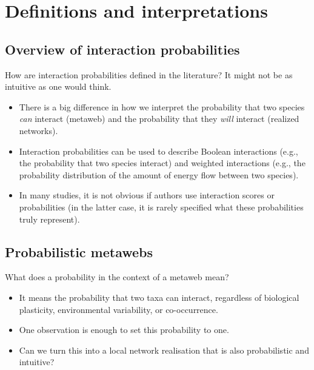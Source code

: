 \documentclass[10pt,oneside]{article}
\begin{document}
\hypertarget{definitions-and-interpretations}{%
\section{Definitions and
interpretations}\label{definitions-and-interpretations}}

\hypertarget{overview-of-interaction-probabilities}{%
\subsection{Overview of interaction
probabilities}\label{overview-of-interaction-probabilities}}

How are interaction probabilities defined in the literature? It might
not be as intuitive as one would think.

\begin{itemize}
\tightlist
\item
  There is a big difference in how we interpret the probability that two
  species \emph{can} interact (metaweb) and the probability that they
  \emph{will} interact (realized networks).
\item
  Interaction probabilities can be used to describe Boolean interactions
  (e.g., the probability that two species interact) and weighted
  interactions (e.g., the probability distribution of the amount of
  energy flow between two species).
\item
  In many studies, it is not obvious if authors use interaction scores
  or probabilities (in the latter case, it is rarely specified what
  these probabilities truly represent).
\end{itemize}

\hypertarget{probabilistic-metawebs}{%
\subsection{Probabilistic metawebs}\label{probabilistic-metawebs}}

What does a probability in the context of a metaweb mean?

\begin{itemize}
\tightlist
\item
  It means the probability that two taxa can interact, regardless of
  biological plasticity, environmental variability, or co-occurrence.
\item
  One observation is enough to set this probability to one.
\item
  Can we turn this into a local network realisation that is also
  probabilistic and intuitive?
\end{itemize}
\end{document}
